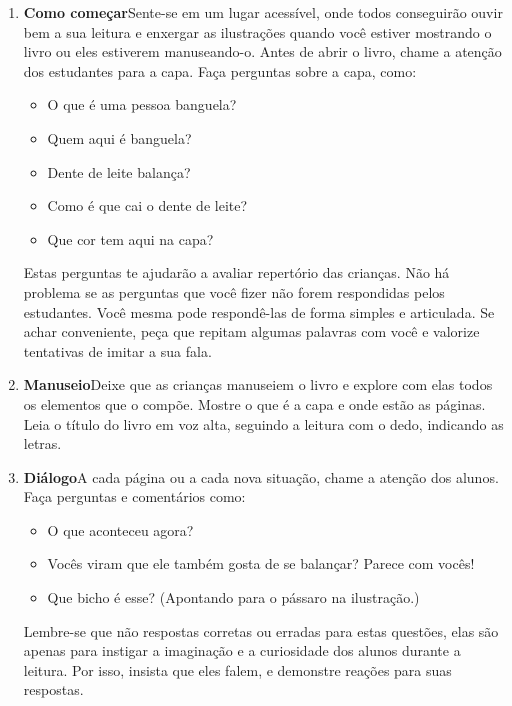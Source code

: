 \documentclass[11pt]{extarticle}
\begin{document}
\begin{enumerate}
\item \textbf{Como começar}\quad Sente-se em um lugar acessível, 
onde todos conseguirão ouvir bem a sua leitura e enxergar as ilustrações 
quando você estiver mostrando o livro ou eles estiverem manuseando-o. 
Antes de abrir o livro, chame a atenção dos estudantes para a capa. 
Faça perguntas sobre a capa, como: 

\begin{itemize}
\item O que é uma pessoa banguela?
\item Quem aqui é banguela?
\item Dente de leite balança?
\item Como é que cai o dente de leite?
\item Que cor tem aqui na capa?
\end{itemize}

Estas perguntas te ajudarão a avaliar repertório das crianças. 
Não há problema se as perguntas que você fizer não forem respondidas pelos 
estudantes. Você mesma pode respondê-las de forma simples e articulada. Se achar 
conveniente, peça que repitam algumas palavras com você e valorize tentativas 
de imitar a sua fala. 
 
\item \textbf{Manuseio}\quad Deixe que as crianças manuseiem o livro 
e explore com elas todos os elementos que o compõe. Mostre o que é a 
capa e onde estão as páginas. Leia o título do livro em voz alta, seguindo 
a leitura com o dedo, indicando as letras. 

\item \textbf{Diálogo}\quad A cada página ou a cada nova situação,
chame a atenção dos alunos. Faça perguntas e comentários como:

\begin{itemize}
\item O que aconteceu agora?
\item Vocês viram que ele também gosta de se balançar? Parece com vocês!
\item Que bicho é esse? (Apontando para o pássaro na ilustração.)
\end{itemize}

Lembre-se que não respostas corretas ou erradas para estas questões,
elas são apenas para instigar a imaginação e a curiosidade
dos alunos durante a leitura. Por isso, insista que eles falem,
e demonstre reações para suas respostas. 


\end{enumerate}
\end{document}
